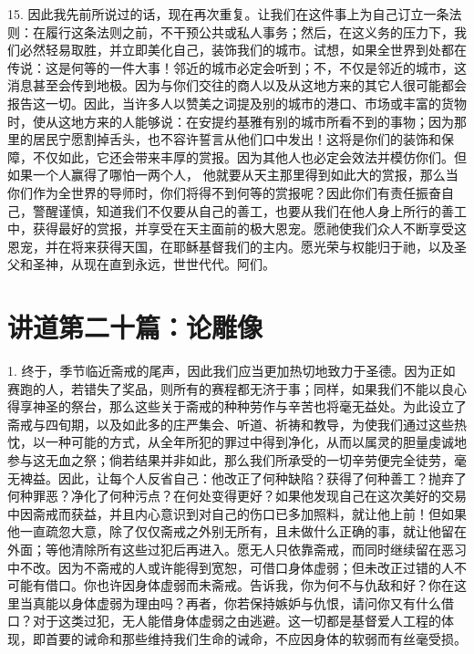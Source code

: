 15. 因此我先前所说过的话，现在再次重复。让我们在这件事上为自己订立一条法则：在履行这条法则之前，不干预公共或私人事务；然后，在这义务的压力下，我们必然轻易取胜，并立即美化自己，装饰我们的城市。试想，如果全世界到处都在传说：这是何等的一件大事！邻近的城市必定会听到；不，不仅是邻近的城市，这消息甚至会传到地极。因为与你们交往的商人以及从这地方来的其它人很可能都会报告这一切。因此，当许多人以赞美之词提及别的城市的港口、市场或丰富的货物时，使从这地方来的人能够说：在安提约基雅有别的城市所看不到的事物；因为那里的居民宁愿割掉舌头，也不容许誓言从他们口中发出！这将是你们的装饰和保障，不仅如此，它还会带来丰厚的赏报。因为其他人也必定会效法并模仿你们。但如果一个人赢得了哪怕一两个人， 他就要从天主那里得到如此大的赏报，那么当你们作为全世界的导师时，你们将得不到何等的赏报呢？因此你们有责任振奋自己，警醒谨慎，知道我们不仅要从自己的善工，也要从我们在他人身上所行的善工中，获得最好的赏报，并享受在天主面前的极大恩宠。愿祂使我们众人不断享受这恩宠，并在将来获得天国，在耶稣基督我们的主内。愿光荣与权能归于祂，以及圣父和圣神，从现在直到永远，世世代代。阿们。\par



\section{讲道第二十篇：论雕像}

\par

1. 终于，季节临近斋戒的尾声，因此我们应当更加热切地致力于圣德。因为正如赛跑的人，若错失了奖品，则所有的赛程都无济于事；同样，如果我们不能以良心得享神圣的祭台，那么这些关于斋戒的种种劳作与辛苦也将毫无益处。为此设立了斋戒与四旬期，以及如此多的庄严集会、听道、祈祷和教导，为使我们通过这些热忱，以一种可能的方式，从全年所犯的罪过中得到净化，从而以属灵的胆量虔诚地参与这无血之祭；倘若结果并非如此，那么我们所承受的一切辛劳便完全徒劳，毫无裨益。因此，让每个人反省自己：他改正了何种缺陷？获得了何种善工？抛弃了何种罪恶？净化了何种污点？在何处变得更好？如果他发现自己在这次美好的交易中因斋戒而获益，并且内心意识到对自己的伤口已多加照料，就让他上前！但如果他一直疏忽大意，除了仅仅斋戒之外别无所有，且未做什么正确的事，就让他留在外面；等他清除所有这些过犯后再进入。愿无人只依靠斋戒，而同时继续留在恶习中不改。因为不斋戒的人或许能得到宽恕，可借口身体虚弱；但未改正过错的人不可能有借口。你也许因身体虚弱而未斋戒。告诉我，你为何不与仇敌和好？你在这里当真能以身体虚弱为理由吗？再者，你若保持嫉妒与仇恨，请问你又有什么借口？对于这类过犯，无人能借身体虚弱之由逃避。这一切都是基督爱人工程的体现，即首要的诫命和那些维持我们生命的诫命，不应因身体的软弱而有丝毫受损。\par

